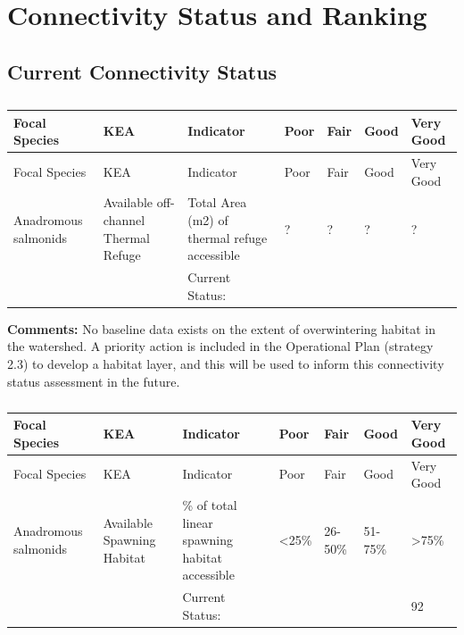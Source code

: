 \documentclass[
  letterpaper,
  DIV=11,
  numbers=noendperiod]{scrreprt}
\begin{document}

\hypertarget{connectivity-status-and-ranking}{%
\chapter{Connectivity Status and
Ranking}\label{connectivity-status-and-ranking}}

\hypertarget{current-connectivity-status-2}{%
\section*{Current Connectivity
Status}\label{current-connectivity-status-2}}


\begin{longtable}[]{@{}lllllll@{}}
\caption{}\label{T_64750}\tabularnewline
\toprule\noalign{}
Focal Species & KEA & Indicator & Poor & Fair & Good & Very Good \\
\midrule\noalign{}
\endfirsthead
\toprule\noalign{}
Focal Species & KEA & Indicator & Poor & Fair & Good & Very Good \\
\midrule\noalign{}
\endhead
\bottomrule\noalign{}
\endlastfoot
Anadromous salmonids & Available off-channel Thermal Refuge & Total Area
(m2) of thermal refuge accessible & ? & ? & ? & ? \\
& & Current Status: & & & & \\
\end{longtable}

\textbf{Comments:} No baseline data exists on the extent of
overwintering habitat in the watershed. A priority action is included in
the Operational Plan (strategy 2.3) to develop a habitat layer, and this
will be used to inform this connectivity status assessment in the
future.

\begin{longtable}[]{@{}lllllll@{}}
\caption{}\label{T_aff6d}\tabularnewline
\toprule\noalign{}
Focal Species & KEA & Indicator & Poor & Fair & Good & Very Good \\
\midrule\noalign{}
\endfirsthead
\toprule\noalign{}
Focal Species & KEA & Indicator & Poor & Fair & Good & Very Good \\
\midrule\noalign{}
\endhead
\bottomrule\noalign{}
\endlastfoot
Anadromous salmonids & Available Spawning Habitat & \% of total linear
spawning habitat accessible & \textless25\% & 26-50\% & 51-75\% &
\textgreater75\% \\
& & Current Status: & & & & 92 \\
\end{longtable}
\end{document}
